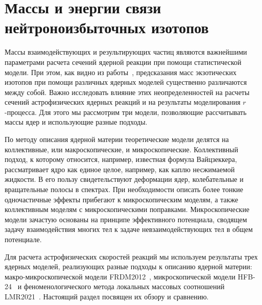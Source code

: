 \section{Массы и энергии связи нейтроноизбыточных изотопов} \label{massmodel}
Массы взаимодействующих и результирующих частиц являются важнейшими параметрами расчета сечений ядерной реакции при помощи статистической модели. 
При этом, как видно из работы~\cite{sobiczewski2018}, предсказания масс экзотических изотопов при помощи различных ядерных моделей существенно различаются между собой. Важно исследовать влияние этих неопределенностей на расчеты сечений астрофизических ядерных реакций и на результаты моделирования $r$-процесса. Для этого мы рассмотрим три модели, позволяющие рассчитывать массы ядер и использующие разные подходы.

По методу описания ядерной материи теоретические модели делятся на коллективные, или макроскопические, и микроскопические. Коллективный подход, к которому относится, например, известная формула Вайцзеккера, рассматривает ядро как единое целое, например, как каплю несжимаемой жидкости. В его пользу свидетельствуют деформации ядер, колебательные и вращательные полосы в спектрах. При необходимости описать более тонкие одночастичные эффекты прибегают к микроскопическим моделям, а также коллективным моделям с микроскопическими поправками. Микроскопические модели зачастую основаны на принципе эффективного потенциала, сводящем задачу взаимодействия многих тел к задаче невзаимодействующих тел в общем потенциале.

Для расчета астрофизических скоростей реакций мы используем результаты трех ядерных моделей, реализующих разные подходы к описанию ядерной материи: макро-микроскопической модели FRDM2012~\cite{moller2016}, микроскопической модели HFB-24~\cite{goriely2013} и феноменологического метода локальных массовых соотношений LMR2021~\cite{vladimirova2022}. Настоящий раздел посвящен их обзору и сравнению.

